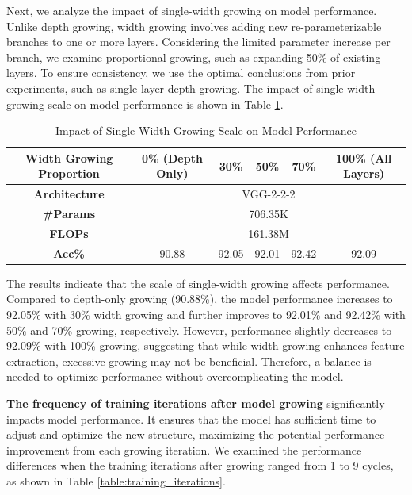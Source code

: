 \documentclass[preprint,12pt]{elsarticle}
\begin{document}
Next, we analyze the impact of single-width growing on model performance. Unlike depth growing, width growing involves adding new re-parameterizable branches to one or more layers. Considering the limited parameter increase per branch, we examine proportional growing, such as expanding 50\% of existing layers. To ensure consistency, we use the optimal conclusions from prior experiments, such as single-layer depth growing. The impact of single-width growing scale on model performance is shown in Table \ref{table:single_width_growth}.

\begin{table}[ht]
\centering
\tiny
\renewcommand{\arraystretch}{1.3}
\begin{adjustbox}{center}
\begin{tabular}{c|ccccc}
\hline
\textbf{Width Growing Proportion} & \textbf{0\% (Depth Only)} & \textbf{30\%} & \textbf{50\%} & \textbf{70\%} & \textbf{100\% (All Layers)} \\
\hline
\textbf{Architecture} & \multicolumn{5}{c}{VGG-2-2-2} \\
\hline
\textbf{\#Params} & \multicolumn{5}{c}{706.35K} \\
\hline
\textbf{FLOPs} & \multicolumn{5}{c}{161.38M} \\
\hline
\textbf{Acc\%} & 90.88 & 92.05 & 92.01 & 92.42 & 92.09 \\
\hline
\end{tabular}
\end{adjustbox}
\caption{Impact of Single-Width Growing Scale on Model Performance}
\label{table:single_width_growth}
\end{table}

The results indicate that the scale of single-width growing affects performance. Compared to depth-only growing (90.88\%), the model performance increases to 92.05\% with 30\% width growing and further improves to 92.01\% and 92.42\% with 50\% and 70\% growing, respectively. However, performance slightly decreases to 92.09\% with 100\% growing, suggesting that while width growing enhances feature extraction, excessive growing may not be beneficial. Therefore, a balance is needed to optimize performance without overcomplicating the model.

\textbf{The frequency of training iterations after model growing} significantly impacts model performance. It ensures that the model has sufficient time to adjust and optimize the new structure, maximizing the potential performance improvement from each growing iteration. We examined the performance differences when the training iterations after growing ranged from 1 to 9 cycles, as shown in Table \ref{table:training_iterations}.
\end{document}
